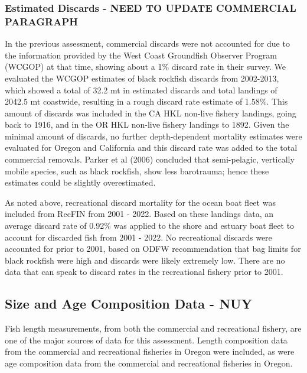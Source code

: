 \documentclass[11pt,
  english,
  letterpaper,
]{article}
\begin{document}
\hypertarget{estimated-discards---need-to-update-commercial-paragraph}{%
\subsubsection{Estimated Discards - NEED TO UPDATE COMMERCIAL PARAGRAPH}\label{estimated-discards---need-to-update-commercial-paragraph}}

In the previous assessment, commercial discards were not accounted for due to the information provided by the West Coast Groundfish Observer Program (WCGOP) at that time, showing about a 1\% discard rate in their survey. We evaluated the WCGOP estimates of black rockfish discards from 2002-2013, which showed a total of 32.2 mt in estimated discards and total landings of 2042.5 mt coastwide, resulting in a rough discard rate estimate of 1.58\%. This amount of discards was included in the CA HKL non-live fishery landings, going back to 1916, and in the OR HKL non-live fishery landings to 1892. Given the minimal amount of discards, no further depth-dependent mortality estimates were evaluated for Oregon and California and this discard rate was added to the total commercial removals. Parker et al (2006) concluded that semi-pelagic, vertically mobile species, such as black rockfish, show less barotrauma; hence these estimates could be slightly overestimated.

As noted above, recreational discard mortality for the ocean boat fleet was included from RecFIN from 2001 - 2022. Based on these landings data, an average discard rate of 0.92\% was applied to the shore and estuary boat fleet to account for discarded fish from 2001 - 2022. No recreational discards were accounted for prior to 2001, based on ODFW recommendation that bag limits for black rockfish were high and discards were likely extremely low. There are no data that can speak to discard rates in the recreational fishery prior to 2001.

\hypertarget{size-and-age-composition-data---nuy}{%
\subsection{Size and Age Composition Data - NUY}\label{size-and-age-composition-data---nuy}}

Fish length measurements, from both the commercial and recreational fishery, are one of the major sources of data for this assessment. Length composition data from the commercial and recreational fisheries in Oregon were included, as were age composition data from the commercial and recreational fisheries in Oregon.
\end{document}
